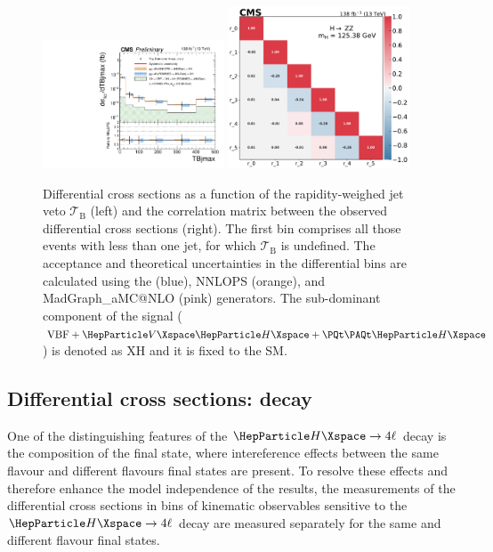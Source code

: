 \begin{center}
	\begin{figure}[!htb]
		\centering
		\includegraphics[width=0.48\textwidth]{Images/H4L/TBjmax_unfoldwith_SM_125_logscale_asimov.pdf}
		\includegraphics[width=0.48\textwidth]{Images/H4L/correlations/corr_TBjmax_v3.pdf}\\
		\caption{
			Differential cross sections as a function of the rapidity-weighed jet veto $\mathcal{T}_{\text{B}}$ (left) and the correlation matrix between the observed differential cross sections (right).
			The first bin comprises all those events with less than one jet, for which $\mathcal{T}_{\text{B}}$ is undefined.
			The acceptance and theoretical uncertainties in the differential bins are calculated using the \POWHEG (blue), NNLOPS (orange), and MadGraph\_aMC@NLO (pink) generators.
			The sub-dominant component of the signal ($\VBF + \VH + \ttH$) is denoted as XH and it is fixed to the SM.
			\label{fig:fidTB}}
	\end{figure}
\end{center}

\clearpage

\subsection{Differential cross sections: decay}
One of the distinguishing features of the $\Hllll$ decay is the composition of the final state, where intereference effects between the same flavour and different flavours final states are present.
To resolve these effects and therefore enhance the model independence of the results, the measurements of the differential cross sections in bins of kinematic observables sensitive to the $\Hllll$ decay are measured separately for the same and different flavour final states.

